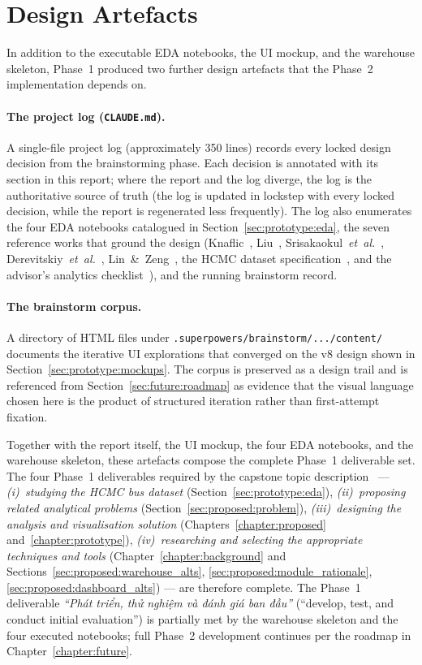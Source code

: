 \section{Design Artefacts}
\label{sec:prototype:artifacts}

In addition to the executable EDA notebooks, the UI mockup, and
the warehouse skeleton, Phase~1 produced two further design
artefacts that the Phase~2 implementation depends on.

\paragraph{The project log (\texttt{CLAUDE.md}).}
A single-file project log (approximately 350 lines) records
every locked design decision from the brainstorming phase. Each
decision is annotated with its section in this report; where
the report and the log diverge, the log is the authoritative
source of truth (the log is updated in lockstep with every
locked decision, while the report is regenerated less
frequently). The log also enumerates the four EDA notebooks
catalogued in Section~\ref{sec:prototype:eda}, the seven
reference works that ground the design
(Knaflic~\cite{knaflic2015}, Liu~\cite{liu2022},
Srisakaokul~\textit{et~al.}~\cite{srisakaokul2023},
Derevitskiy~\textit{et~al.}~\cite{derevitskiy2016},
Lin~\&~Zeng~\cite{linzeng2014}, the HCMC dataset
specification~\cite{hcmcgps2025}, and the advisor's analytics
checklist~\cite{thoai2025}), and the running brainstorm record.

\paragraph{The brainstorm corpus.}
A directory of HTML files under
\texttt{.superpowers/brainstorm/.../content/} documents the
iterative UI explorations that converged on the v8 design
shown in Section~\ref{sec:prototype:mockups}. The corpus is
preserved as a design trail and is referenced from
Section~\ref{sec:future:roadmap} as evidence that the visual
language chosen here is the product of structured iteration
rather than first-attempt fixation.

Together with the report itself, the UI mockup, the four EDA
notebooks, and the warehouse skeleton, these artefacts compose
the complete Phase~1 deliverable set. The four Phase~1
deliverables required by the capstone topic
description~\cite{capstoneDescription} ---
\emph{(i)~studying the HCMC bus dataset}
(Section~\ref{sec:prototype:eda}),
\emph{(ii)~proposing related analytical problems}
(Section~\ref{sec:proposed:problem}),
\emph{(iii)~designing the analysis and visualisation solution}
(Chapters~\ref{chapter:proposed} and~\ref{chapter:prototype}),
\emph{(iv)~researching and selecting the appropriate techniques
and tools}
(Chapter~\ref{chapter:background} and
Sections~\ref{sec:proposed:warehouse_alts},
\ref{sec:proposed:module_rationale},
\ref{sec:proposed:dashboard_alts}) ---
are therefore complete. The Phase~1 deliverable
\emph{``Phát triển, thử nghiệm và đánh giá ban đầu''}
(``develop, test, and conduct initial evaluation'') is partially
met by the warehouse skeleton and the four executed notebooks;
full Phase~2 development continues per the roadmap in
Chapter~\ref{chapter:future}.
